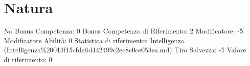 \section{Natura}\label{natura}

\begin{description}
\tightlist
\item[Tags: ABI]
No Bonus Competenza: 0 Bonus Competenza di Riferimento: 2 Modificatore:
-5 Modificatore Abilità: 0 Statistica di riferimento: Intelligenza
(Intelligenza\%20013f15cfda6d442499c2ec8c0ce053ea.md) Tiro Salvezza: -5
Valore di riferimento: 0
\end{description}
